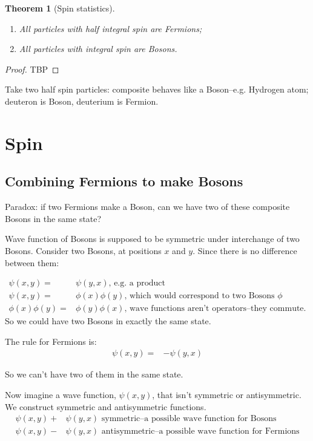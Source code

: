 \documentclass[]{article}
\newtheorem{thm}{Theorem}
\begin{document}
\begin{thm}[Spin statistics]
	\begin{enumerate}
		\item All particles with half integral spin are Fermions;
		\item All particles with  integral spin are Bosons.
	\end{enumerate}
\end{thm}

\begin{proof}
	TBP
\end{proof}
Take two half spin particles: composite behaves like a Boson--e.g. Hydrogen atom; deuteron is Boson, deuterium is Fermion.


\section{Spin}

\subsection{Combining Fermions to make Bosons}

Paradox: if two Fermions make a Boson, can we have two of these composite Bosons in the same state?

Wave function of Bosons is supposed to be symmetric under interchange of two Bosons. Consider two Bosons, at positions $x$ and $y$. Since there is no difference between them:

\begin{align*}
	\psi(x,y) =&\psi(y,x) \text{, e.g. a product}\\
	\psi(x,y) =& \phi(x)\phi(y) \text{, which would correspond to two Bosons $\phi$}\\
	\phi(x)\phi(y) =& \phi(y)\phi(x) \text{, wave functions aren't operators--they commute.}
\end{align*}
So we could have two Bosons in exactly the same state.

The rule for Fermions is:
\begin{align*}
		\psi(x,y) =&-\psi(y,x)
\end{align*}

So we can't have two of them in the same state.

Now imagine a wave function, $\psi(x,y)$, that isn't symmetric or antisymmetric. We construct symmetric and antisymmetric functions.
\begin{align*}
	\psi(x,y)+& \psi(y,x) \text{ symmetric--a possible wave function for Bosons}\\
	\psi(x,y)-& \psi(y,x) \text{ antisymmetric--a possible wave function for Fermions}
\end{align*}
\end{document}
